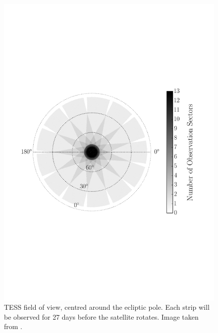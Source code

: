 \documentclass[a4paper,fleqn,usenatbib,useAMS]{mnras}
\begin{document}
\begin{figure}
	\centering
	\includegraphics[scale=0.4]{cropped_TESSfield.pdf}
	\caption{TESS field of view, centred around the ecliptic pole. Each strip will be observed for 27 days before the satellite rotates. Image taken from \citet{campante_asteroseismic_2016}.}	
	\label{TESS field}
\end{figure} 
\end{document}
